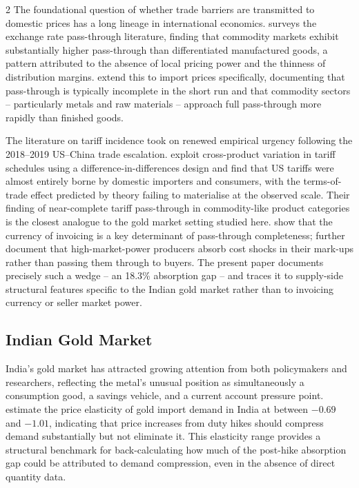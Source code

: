 \documentclass[12pt]{article}
\begin{document}
\begin{multicols}{2}
The foundational question of whether trade barriers are transmitted to domestic prices has a long lineage in international economics. \citet{Menon1995} surveys the exchange rate pass-through literature, finding that commodity markets exhibit substantially higher pass-through than differentiated manufactured goods, a pattern attributed to the absence of local pricing power and the thinness of distribution margins. \citet{Campa2002} extend this to import prices specifically, documenting that pass-through is typically incomplete in the short run and that commodity sectors -- particularly metals and raw materials -- approach full pass-through more rapidly than finished goods.

The literature on tariff incidence took on renewed empirical urgency following the 2018--2019 US--China trade escalation. \citet{Fajgelbaum2020} exploit cross-product variation in tariff schedules using a difference-in-differences design and find that US tariffs were almost entirely borne by domestic importers and consumers, with the terms-of-trade effect predicted by theory failing to materialise at the observed scale. Their finding of near-complete tariff pass-through in commodity-like product categories is the closest analogue to the gold market setting studied here. \citet{Gopinath2010} show that the currency of invoicing is a key determinant of pass-through completeness; \citet{Amiti2019} further document that high-market-power producers absorb cost shocks in their mark-ups rather than passing them through to buyers. The present paper documents precisely such a wedge -- an 18.3\% absorption gap -- and traces it to supply-side structural features specific to the Indian gold market rather than to invoicing currency or seller market power.

\subsection*{Indian Gold Market}

India's gold market has attracted growing attention from both policymakers and researchers, reflecting the metal's unusual position as simultaneously a consumption good, a savings vehicle, and a current account pressure point. \citet{KanjilalGhosh2014} estimate the price elasticity of gold import demand in India at between $-0.69$ and $-1.01$, indicating that price increases from duty hikes should compress demand substantially but not eliminate it. This elasticity range provides a structural benchmark for back-calculating how much of the post-hike absorption gap could be attributed to demand compression, even in the absence of direct quantity data.


\end{multicols}
\end{document}

